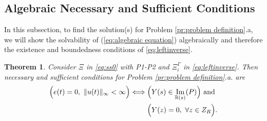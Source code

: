 \documentclass[10pt,a4paper]{amsart}
\newtheorem{theorem}{Theorem}
\theoremstyle{remark}
\DeclareMathOperator*{\im}{Im}
\begin{document}
\subsection{Algebraic Necessary and Sufficient Conditions} \label{sec:algebraic_iff}
In this subsection, to find the solution(s) for Problem \ref{pr:problem definition}.a, we will show the solvability of (\ref{eq:algebraic equation}) algebraically and therefore the existence and boundedness conditions of \eqref{eq:leftinverse}. 


\begin{theorem} \label{th:algebraic_iff}
Consider $\Xi$ in \eqref{eq:ss0} with P1-P2 and $\Xi^\Gamma_i$ in \eqref{eq:leftinverse}. Then necessary and sufficient conditions for Problem \ref{pr:problem definition}.a. are
\begin{align*}
    \Bigl( e(t)=0, \ \Vert u(t) \Vert_\infty < \infty \Bigl) \iff & \Bigl( Y(s) \in \im_{\mathbb{R}(s)}(P) \Bigl) \text{ and } \\
     & \Bigl( Y(z) = 0, \ \forall z \in Z_R \Bigl).
\end{align*}
\end{theorem}
\end{document}
